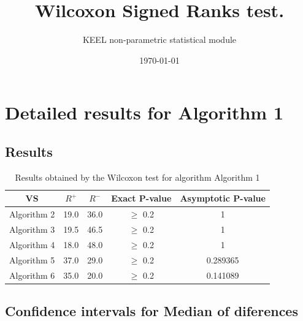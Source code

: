 \documentclass[a4paper,10pt]{article}
\title{Wilcoxon Signed Ranks test.}
\date{\today}
\author{KEEL non-parametric statistical module}
\begin{document}
\pagestyle{empty}
\maketitle
\thispagestyle{empty}



\section{Detailed results for Algorithm 1}


\subsection{Results}

\begin{table}[!htp]
\centering\small
\begin{tabular}{
|c|c|c|c|c|}
\hline
 VS & $R^{+}$ & $R^{-}$ & Exact P-value & Asymptotic P-value \\ \hline 
Algorithm 2 & 19.0 & 36.0 & $\geq$ 0.2 & 1\\ \hline 
Algorithm 3 & 19.5 & 46.5 & $\geq$ 0.2 & 1\\ \hline 
Algorithm 4 & 18.0 & 48.0 & $\geq$ 0.2 & 1\\ \hline 
Algorithm 5 & 37.0 & 29.0 & $\geq$ 0.2 & 0.289365\\ \hline 
Algorithm 6 & 35.0 & 20.0 & $\geq$ 0.2 & 0.141089\\ \hline 

\end{tabular}
\caption{Results obtained by the Wilcoxon test for algorithm Algorithm 1}
\end{table}

\subsection{Confidence intervals for Median of diferences}
\end{document}
